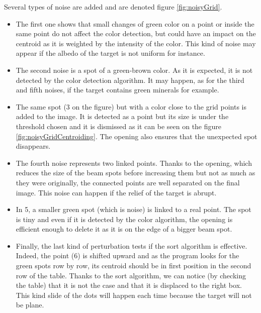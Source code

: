 Several types of noise are added and are denoted figure \ref{fig:noisyGrid}. 
\begin{itemize}
\item The first one shows that small changes of green color on a point or inside the same point do not affect the color detection, but could have an impact on the centroid as it is weighted by the intensity of the color. This kind of noise may appear if the albedo of the target is not uniform for instance.
\item The second noise is a spot of a green-brown color. As it is expected, it is not detected by the color detection algorithm. It may happen, as for the third and fifth noises, if the target contains green minerals for example.
\item The same spot (3 on the figure) but with a color close to the grid points is added to the image. It is detected as a point but its size is under the threshold chosen and it is dismissed as it can be seen on the figure \ref{fig:noisyGridCentroiding}. The opening also ensures that the unexpected spot disappears. 
\item The fourth noise represents two linked points. Thanks to the opening, which reduces the size of the beam spots before increasing them but not as much as they were originally, the connected points are well separated on the final image. This noise can happen if the relief of the target is abrupt.
\item In 5, a smaller green spot (which is noise) is linked to a real point. The spot is tiny and even if it is detected by the color algorithm, the opening is efficient enough to delete it as it is on the edge of a bigger beam spot.
\item Finally, the last kind of perturbation tests if the sort algorithm is effective. Indeed, the point (6) is shifted upward and as the program looks for the green spots row by row, its centroid should be in first position in the second row of the table. Thanks to the sort algorithm, we can notice (by checking the table) that it is not the case and that it is displaced to the right box. This kind slide of the dots will happen each time because the target will not be plane.
\end{itemize}

